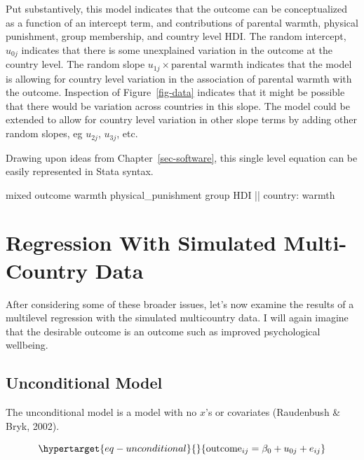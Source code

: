 \documentclass[
  letterpaper,
  DIV=11,
  numbers=noendperiod]{scrreprt}
\newenvironment{Shaded}{\begin{snugshade}}{\end{snugshade}}
\newcommand{\FunctionTok}[1]{\textcolor[rgb]{0.28,0.35,0.67}{#1}}
\newcommand{\NormalTok}[1]{\textcolor[rgb]{0.00,0.23,0.31}{#1}}
\begin{document}
Put substantively, this model indicates that the outcome can be
conceptualized as a function of an intercept term, and contributions of
parental warmth, physical punishment, group membership, and country
level HDI. The random intercept, \(u_{0j}\) indicates that there is some
unexplained variation in the outcome at the country level. The random
slope \(u_{1j} \times \text{parental warmth}\) indicates that the model
is allowing for country level variation in the association of parental
warmth with the outcome. Inspection of Figure~\ref{fig-data} indicates
that it might be possible that there would be variation across countries
in this slope. The model could be extended to allow for country level
variation in other slope terms by adding other random slopes, eg
\(u_{2j}\), \(u_{3j}\), etc.

Drawing upon ideas from Chapter~\ref{sec-software}, this single level
equation can be easily represented in Stata syntax.

\begin{Shaded}
\begin{Highlighting}[]

\NormalTok{mixed outcome warmth physical\_punishment }\FunctionTok{group}\NormalTok{ HDI || country: warmth}
\end{Highlighting}
\end{Shaded}

\hypertarget{sec-regression}{%
\section{Regression With Simulated Multi-Country
Data}\label{sec-regression}}

After considering some of these broader issues, let's now examine the
results of a multilevel regression with the simulated multicountry data.
I will again imagine that the desirable outcome is an outcome such as
improved psychological wellbeing.

\hypertarget{sec-unconditional}{%
\subsection{Unconditional Model}\label{sec-unconditional}}

The unconditional model is a model with no \(x\)'s or covariates
(Raudenbush \& Bryk, 2002).

\begin{equation}\protect\hypertarget{eq-unconditional}{}{\text{outcome}_{ij} = \beta_0 + u_{0j} + e_{ij}}\label{eq-unconditional}\end{equation}
\end{document}

